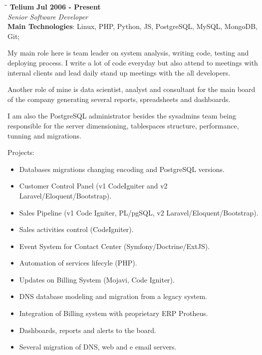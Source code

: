 \documentclass[margin]{res}
\begin{document}
\begin{resume}
\vspace{-0.1in}
   \begin{tabbing}
   \hspace{2.3in}\= \hspace{1.7in}\= \kill %
    \textbf{Telium}    \>\>\textbf{Jul 2006 - Present}\\
    \textit{Senior Software Developer}\\        
    \textbf{Main Technologies}: Linux, PHP, Python, JS, PostgreSQL, MySQL, MongoDB, Git;
   \end{tabbing}\vspace{-20pt}      %
    \vspace{2mm}
    My main role here is team leader on system analysis, writing code, testing and deploying process. I write a lot of code everyday but also attend to meetings with internal clients and lead daily stand up meetings with the all developers.

    Another role of mine is data scientist, analyst and consultant for the main board of the company generating several reports, spreadsheets and dashboards.

    I am also the PostgreSQL administrator besides the sysadmins team being responsible for the server dimensioning, tablespaces structure, performance, tunning and migrations.

    Projects:
    \begin{itemize}
      \item Databases migrations changing encoding and PostgreSQL versions.
      \item Customer Control Panel (v1 CodeIgniter and v2 Laravel/Eloquent/Bootstrap).
      \item Sales Pipeline (v1 Code Igniter, PL/pgSQL, v2 Laravel/Eloquent/Bootstrap).
      \item Sales activities control (CodeIgniter).
      \item Event System for Contact Center (Symfony/Doctrine/ExtJS).
      \item Automation of services lifecyle (PHP).
      \item Updates on Billing System (Mojavi, Code Igniter).
      \item DNS database modeling and migration from a legacy system.
      \item Integration of Billing system with proprietary ERP Protheus.
      \item Dashboards, reports and alerts to the board.
      \item Several migration of DNS, web and e email servers.
    \end{itemize}


\end{resume}
\end{document}
